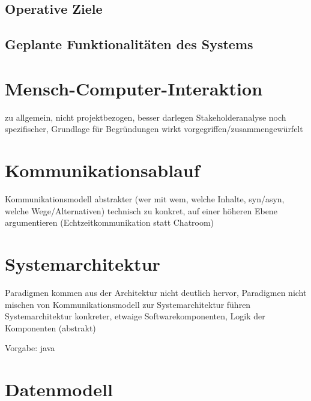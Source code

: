 \documentclass[12pt]{scrartcl}
\begin{document}
\subsection{Operative Ziele}

\subsection[Geplante Funktionalitäten]{Geplante Funktionalitäten des Systems}



\section{Mensch-Computer-Interaktion}

zu allgemein, nicht projektbezogen, besser darlegen
Stakeholderanalyse noch spezifischer, Grundlage für Begründungen
wirkt vorgegriffen/zusammengewürfelt


\section{Kommunikationsablauf}

Kommunikationsmodell abstrakter (wer mit wem, welche Inhalte, syn/asyn, welche Wege/Alternativen)
technisch zu konkret, auf einer höheren Ebene argumentieren (Echtzeitkommunikation statt Chatroom)




\section{Systemarchitektur}

Paradigmen kommen aus der Architektur nicht deutlich hervor, Paradigmen nicht mischen
von Kommunikationsmodell zur Systemarchitektur führen
Systemarchitektur konkreter, etwaige Softwarekomponenten, Logik der Komponenten (abstrakt)

Vorgabe: java


\section{Datenmodell}
\end{document}
